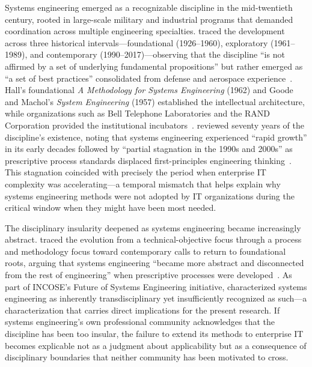 Systems engineering emerged as a recognizable discipline in the mid-twentieth century, rooted in large-scale military and industrial programs that demanded coordination across multiple engineering specialties. \citeauthor{Hossain_2020} traced the development across three historical intervals---foundational (1926--1960), exploratory (1961--1989), and contemporary (1990--2017)---observing that the discipline ``is not affirmed by a set of underlying fundamental propositions'' but rather emerged as ``a set of best practices'' consolidated from defense and aerospace experience~\parencite{Hossain_2020}. Hall's foundational \textit{A Methodology for Systems Engineering} (1962) and Goode and Machol's \textit{System Engineering} (1957) established the intellectual architecture, while organizations such as Bell Telephone Laboratories and the RAND Corporation provided the institutional incubators~\parencite{Hossain_2020}. \citeauthor{Honour_2018} reviewed seventy years of the discipline's existence, noting that systems engineering experienced ``rapid growth'' in its early decades followed by ``partial stagnation in the 1990s and 2000s'' as prescriptive process standards displaced first-principles engineering thinking~\parencite{Honour_2018}. This stagnation coincided with precisely the period when enterprise IT complexity was accelerating---a temporal mismatch that helps explain why systems engineering methods were not adopted by IT organizations during the critical window when they might have been most needed.

The disciplinary insularity deepened as systems engineering became increasingly abstract. \citeauthor{Pennotti_2024} traced the evolution from a technical-objective focus through a process and methodology focus toward contemporary calls to return to foundational roots, arguing that systems engineering ``became more abstract and disconnected from the rest of engineering'' when prescriptive processes were developed~\parencite{Pennotti_2024}. As part of INCOSE's Future of Systems Engineering initiative, \citeauthor{Pennotti_2024} characterized systems engineering as inherently transdisciplinary yet insufficiently recognized as such---a characterization that carries direct implications for the present research. If systems engineering's own professional community acknowledges that the discipline has been too insular, the failure to extend its methods to enterprise IT becomes explicable not as a judgment about applicability but as a consequence of disciplinary boundaries that neither community has been motivated to cross.

